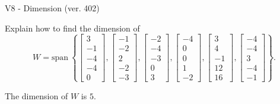 \begin{exercise}
  \begin{exerciseTitle}V8 - Dimension (ver. 402)\end{exerciseTitle}
  \begin{exerciseStatement}
    Explain how to find the dimension of 
\[W=\mathrm{span}\ \left\{\left[\begin{array}{r}
3 \\
-1 \\
-4 \\
-4 \\
0
\end{array}\right] , \left[\begin{array}{r}
-1 \\
-2 \\
2 \\
-2 \\
-3
\end{array}\right] , \left[\begin{array}{r}
-2 \\
-4 \\
-3 \\
0 \\
3
\end{array}\right] , \left[\begin{array}{r}
-4 \\
0 \\
0 \\
1 \\
-2
\end{array}\right] , \left[\begin{array}{r}
3 \\
4 \\
-1 \\
12 \\
16
\end{array}\right] , \left[\begin{array}{r}
-4 \\
-4 \\
3 \\
-4 \\
-1
\end{array}\right]\right\}.\]



  \end{exerciseStatement}
  \begin{exerciseAnswer}
   The dimension of \(W\) is  \(5\).
  


  \end{exerciseAnswer}
\end{exercise}